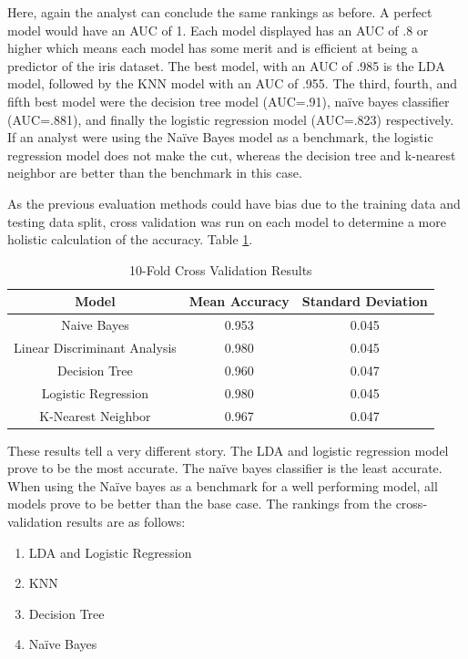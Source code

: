 \documentclass[journal]{IEEEtran}
\begin{document}
Here, again the analyst can conclude the same rankings as before. A perfect model would have an AUC of 1. Each model displayed has an AUC of .8 or higher which means each model has some merit and is efficient at being a predictor of the iris dataset. The best model, with an AUC of .985 is the LDA model, followed by the KNN model with an AUC of .955. The third, fourth, and fifth best model were the decision tree model (AUC=.91), naïve bayes classifier (AUC=.881), and finally the logistic regression model (AUC=.823) respectively. If an analyst were using the Naïve Bayes model as a benchmark, the logistic regression model does not make the cut, whereas the decision tree and k-nearest neighbor are better than the benchmark in this case. 

As the previous evaluation methods could have bias due to the training data and testing data split, cross validation was run on each model to determine a more holistic calculation of the accuracy. Table \ref{table:crossval}. 

\begin{table}[h!]
    \centering
    \begin{tabular}{c | c c}
        Model & Mean Accuracy & Standard Deviation \\
        \hline
        Naive Bayes	& 0.953	& 0.045 \\
        Linear Discriminant Analysis	& 0.980	& 0.045 \\
        Decision Tree	& 0.960	& 0.047 \\
        Logistic Regression	& 0.980	& 0.045 \\
        K-Nearest Neighbor	& 0.967	& 0.047 \\

    \end{tabular}
    \caption{10-Fold Cross Validation Results}
    \label{table:crossval}
\end{table}

These results tell a very different story. The LDA and logistic regression model prove to be the most accurate. The naïve bayes classifier is the least accurate. When using the Naïve bayes as a benchmark for a well performing model, all models prove to be better than the base case. The rankings from the cross-validation results are as follows: 
\begin{enumerate}
    \item LDA and Logistic Regression
    \item KNN
    \item Decision Tree 
    \item Naïve Bayes
\end{enumerate}
\end{document}

